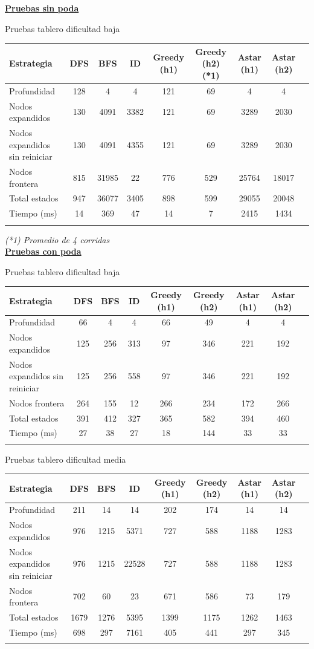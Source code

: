 \documentclass[10pt,journal,compsoc]{IEEEtran}
\begin{document}
\newpage
\clearpage
{\bf\underline{Pruebas sin poda}}

Pruebas tablero dificultad baja

\begin{tabular}{l c c c c c c c c}
\hline\hline
Estrategia & DFS & BFS & ID & Greedy (h1) & Greedy (h2)(*1) & Astar (h1) & Astar (h2)\\
\hline
Profundidad	 & 128 & 4 & 4 & 121 & 69 & 4 & 4\\
Nodos expandidos 	 & 130 & 4091 & 3382 & 121 & 69 & 3289 & 2030\\
Nodos expandidos sin reiniciar & 130 & 4091 & 4355 & 121 & 69 & 3289 & 2030\\
Nodos frontera 	& 815 & 31985 & 22 & 776 & 529 & 25764 & 18017\\
Total estados 	& 947 & 36077 & 3405 & 898 & 599 & 29055 & 20048\\
Tiempo (ms)		& 14 & 369 & 47 & 14 & 7 & 2415 & 1434\\
\hline\hline
\label{board1_sinpoda}
\end{tabular}

\textit{(*1) Promedio de 4 corridas}\\

{\bf\underline{Pruebas con poda}}

Pruebas tablero dificultad baja

\begin{tabular}{l c c c c c c c c}
\hline\hline
Estrategia & DFS & BFS & ID & Greedy (h1) & Greedy (h2) & Astar (h1) & Astar (h2)\\
\hline
Profundidad	 & 66 & 4 & 4 & 66 & 49 & 4 & 4\\
Nodos expandidos  & 125 & 256 & 313 & 97 & 346 & 221& 192\\
Nodos expandidos sin reiniciar & 125 & 256 & 558 & 97 & 346 & 221& 192\\
Nodos frontera 	& 264 & 155 & 12 & 266 & 234 & 172 & 266\\
Total estados 	& 391 & 412 & 327 & 365 & 582 & 394 & 460\\
Tiempo (ms)		& 27 & 38 & 27 & 18 & 144 & 33 & 33\\
\hline\hline
\label{board1_conpoda}
\end{tabular}

Pruebas tablero dificultad media

\begin{tabular}{l c c c c c c c c}
\hline\hline
Estrategia & DFS & BFS & ID & Greedy (h1) & Greedy (h2) & Astar (h1) & Astar (h2)\\
\hline
Profundidad	 & 211 & 14 & 14 & 202 & 174 & 14 & 14\\
Nodos expandidos 	 & 976 & 1215 & 5371 & 727 & 588 & 1188 & 1283\\
Nodos expandidos sin reiniciar & 976 & 1215 & 22528 & 727 & 588 & 1188 & 1283\\
Nodos frontera 	& 702 & 60 & 23 & 671 & 586 & 73 & 179 \\
Total estados 	& 1679 & 1276 & 5395 & 1399 & 1175 & 1262 & 1463\\
Tiempo (ms)		& 698 & 297 & 7161 & 405 & 441 & 297 & 345\\
\hline\hline
\label{board2_conpoda}
\end{tabular}
\end{document}
